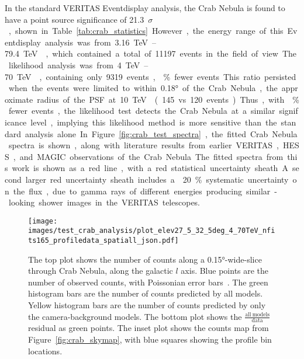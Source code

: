   In the standard VERITAS Eventdisplay analysis, the Crab Nebula is found to have a point source significance of \SI{21.3}{$\sigma$}, shown in Table~\ref{tab:crab_statistics}.
  However, the energy range of this Eventdisplay analysis was from \SIrange{3.16}{79.4}{\TeV{}}, which contained a total of 11197 events in the field of view.
  The likelihood analysis was from \SIrange{4}{70}{\TeV{}}, containing only 9319 events, \% fewer events.
  This ratio persisted when the events were limited to within \ang{0.18} of the Crab Nebula, the approximate radius of the PSF at \SI{10}{\TeV{}} (145 vs 120 events).
  Thus, with \% fewer events, the likelihood test detects the Crab Nebula at a similar significance level, implying this likelihood method is more sensitive than the standard analysis alone.
  In Figure~\ref{fig:crab_test_spectra}, the fitted Crab Nebula spectra is shown, along with literature results from earlier VERITAS, HESS, and MAGIC observations of the Crab Nebula.
  The fitted spectra from this work is shown as a red line, with a red statistical uncertainty sheath.
  A second larger red uncertainty sheath includes a \nicetilde{}20\% systematic uncertainty on the flux, due to gamma rays of different energies producing similar-looking shower images in the VERITAS telescopes.
  
  \begin{figure}[p]
    \centering
    \texttt{[image: images/test\_crab\_analysis/plot\_elev27\_5\_32\_5deg\_4\_70TeV\_nfits165\_profiledata\_spatiall\_json.pdf]}
    \caption[Crab Nebula Profile along Galactic $l$]
    {
      The top plot shows the number of counts along a \ang{0.15}-wide-slice through Crab Nebula, along the galactic $l$ axis.
      Blue points are the number of observed counts, with Poissonian error bars~\cite{poissonfrequentistinterval}.
      The green histogram bars are the number of counts predicted by all models.
      Yellow histogram bars are the number of counts predicted by only the camera-background models.
      The bottom plot shows the $\frac{\mathrm{all\:models}}{\mathrm{data}}$ residual as green points.
      The inset plot shows the counts map from Figure~\ref{fig:crab_skymap}, with blue squares showing the profile bin locations.
    }
    \label{fig:crab_profile_l}
  \end{figure}

